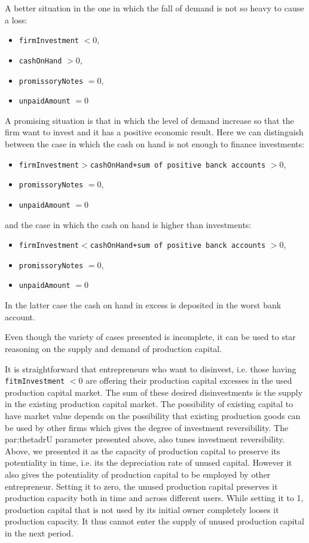 \documentclass{book}
\begin{document}
A better situation in the one in which the fall of demand is not so heavy to cause a loss:\\
\begin{itemize}
	\item \verb+firmInvestment+ $<0$,
	\item \verb+cashOnHand+ $>0$,
	\item \verb+promissoryNotes+ $=0$,
	\item \verb+unpaidAmount+ $=0$
\end{itemize}

A promising situation is that in which the level of demand increase so that the firm want to invest and it has a positive economic result. Here we can distinguish between the case in which the cash on hand is not enough to finance investments:\\  
\begin{itemize}
	\item \verb+firmInvestment+$>$\verb|cashOnHand+sum of positive banck accounts| $>0$, 
	\item \verb+promissoryNotes+ $=0$, 
	\item \verb+unpaidAmount+ $=0$
\end{itemize}
and the case in which the cash on hand is higher than investments:\\
\begin{itemize}
	\item \verb+firmInvestment+$ < $\verb|cashOnHand+sum of positive banck accounts| $>0$, 
	\item \verb+promissoryNotes+ $=0$, 
	\item \verb+unpaidAmount+ $=0$
\end{itemize}
In the latter case the cash on hand in excess is deposited in the worst bank account.

Even though the variety of cases presented is incomplete, it can be used to star reasoning on the supply and demand of production capital.

It is straightforward that entrepreneurs who want to disinvest, i.e. those having \verb+fitmInvestment+ $<0$ are offering their production capital excesses in the used production capital market. 
The sum of these desired disinvestments is the supply in the existing production capital market. 
The possibility of existing capital to have market value depends on the possibility that existing production goods can be used by other firms which gives the degree of investment reversibility. The \gls{par:thetadrU} parameter presented above, also tunes investment reversibility. Above, we presented it as the capacity of production capital to preserve its potentiality in time, i.e. its the depreciation rate of unused capital. 
However it also gives the potentiality of production capital to be employed by other entrepreneur.
Setting it to zero, the unused production capital preserves it production capacity both in time and across different users. While setting it to 1, production capital that is not used by its initial owner completely looses it production capacity. It thus cannot enter the supply of unused production capital in the next period.  
\end{document}
